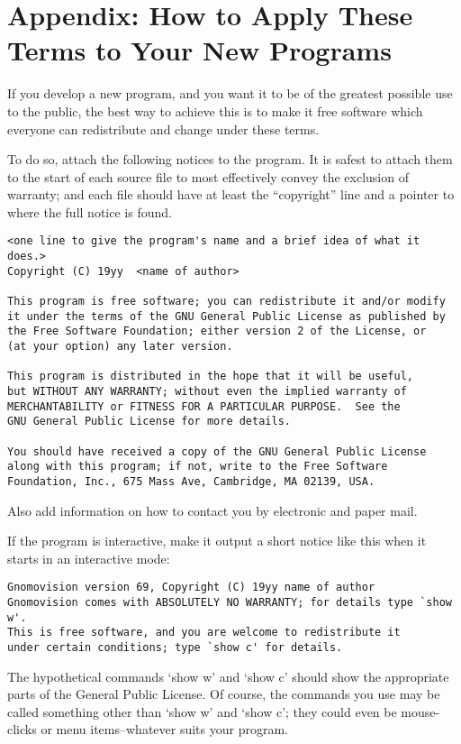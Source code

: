 \documentclass[a4paper]{report}
\begin{document}
\section*{Appendix: How to Apply These Terms to Your New Programs}

If you develop a new program, and you want it to be of the greatest possible
use to the public, the best way to achieve this is to make it free software
which everyone can redistribute and change under these terms.

To do so, attach the following notices to the program.  It is safest to
attach them to the start of each source file to most effectively convey the
exclusion of warranty; and each file should have at least the ``copyright''
line and a pointer to where the full notice is found.

\begin{verbatim}
<one line to give the program's name and a brief idea of what it does.>
Copyright (C) 19yy  <name of author>

This program is free software; you can redistribute it and/or modify
it under the terms of the GNU General Public License as published by
the Free Software Foundation; either version 2 of the License, or
(at your option) any later version.

This program is distributed in the hope that it will be useful,
but WITHOUT ANY WARRANTY; without even the implied warranty of
MERCHANTABILITY or FITNESS FOR A PARTICULAR PURPOSE.  See the
GNU General Public License for more details.

You should have received a copy of the GNU General Public License
along with this program; if not, write to the Free Software
Foundation, Inc., 675 Mass Ave, Cambridge, MA 02139, USA.
\end{verbatim}

Also add information on how to contact you by electronic and paper mail.

If the program is interactive, make it output a short notice like this when
it starts in an interactive mode:

\begin{verbatim}
Gnomovision version 69, Copyright (C) 19yy name of author
Gnomovision comes with ABSOLUTELY NO WARRANTY; for details type `show w'.
This is free software, and you are welcome to redistribute it
under certain conditions; type `show c' for details.
\end{verbatim}

The hypothetical commands `show w' and `show c' should show the appropriate
parts of the General Public License.  Of course, the commands you use may be
called something other than `show w' and `show c'; they could even be
mouse-clicks or menu items--whatever suits your program.
\end{document}
